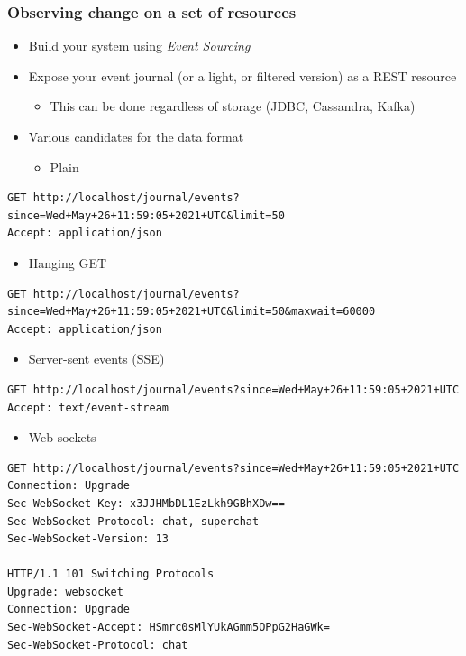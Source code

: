 \documentclass[8pt]{article}
\begin{document}
\subsubsection{Observing change on a set of resources}
\label{sec:org5d89427}
\begin{itemize}
\item Build your system using \emph{Event Sourcing}
\item Expose your event journal (or a light, or filtered version) as a REST resource
\begin{itemize}
\item This can be done regardless of storage (JDBC, Cassandra, Kafka)
\end{itemize}
\item Various candidates for the data format
\begin{itemize}
\item Plain
\end{itemize}
\end{itemize}
\begin{verbatim}
GET http://localhost/journal/events?since=Wed+May+26+11:59:05+2021+UTC&limit=50
Accept: application/json
\end{verbatim}
\begin{itemize}
\item Hanging GET
\end{itemize}
\begin{verbatim}
GET http://localhost/journal/events?since=Wed+May+26+11:59:05+2021+UTC&limit=50&maxwait=60000
Accept: application/json
\end{verbatim}
\begin{itemize}
\item Server-sent events (\href{https://developer.mozilla.org/en-US/docs/Web/API/Server-sent\_events/Using\_server-sent\_events}{SSE})
\end{itemize}
\begin{verbatim}
GET http://localhost/journal/events?since=Wed+May+26+11:59:05+2021+UTC
Accept: text/event-stream
\end{verbatim}
\begin{itemize}
\item Web sockets
\end{itemize}
\begin{verbatim}
GET http://localhost/journal/events?since=Wed+May+26+11:59:05+2021+UTC
Connection: Upgrade
Sec-WebSocket-Key: x3JJHMbDL1EzLkh9GBhXDw==
Sec-WebSocket-Protocol: chat, superchat
Sec-WebSocket-Version: 13

HTTP/1.1 101 Switching Protocols
Upgrade: websocket
Connection: Upgrade
Sec-WebSocket-Accept: HSmrc0sMlYUkAGmm5OPpG2HaGWk=
Sec-WebSocket-Protocol: chat
\end{verbatim}
\end{document}
